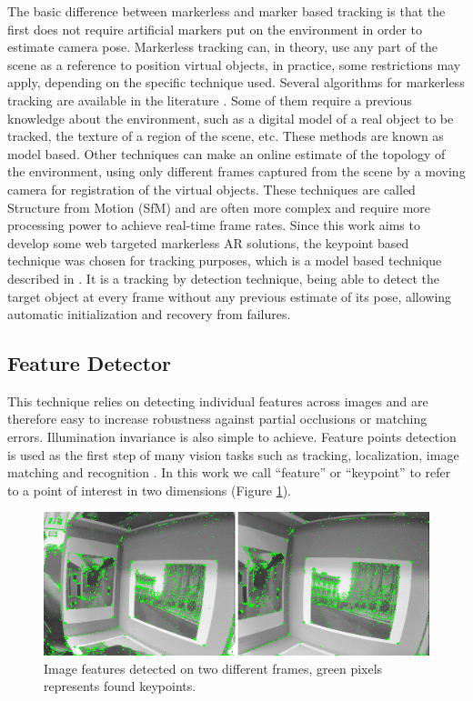 The basic difference between markerless and marker based tracking is that the first does not require artificial markers put on the environment in order to estimate camera pose. Markerless tracking can, in theory, use any part of the scene as a reference to position virtual objects, in practice, some restrictions may apply, depending on the specific technique used. Several algorithms for markerless tracking are available in the literature \cite{Teichrieb2007}. Some of them require a previous knowledge about the environment, such as a digital model of a real object to be tracked, the texture of a region of the scene, etc. These methods are known as model based. Other techniques can make an online estimate of the topology of the environment, using only different frames captured from the scene by a moving camera for registration of the virtual objects. These techniques are called Structure from Motion (SfM) and are often more complex and require more processing power to achieve real-time frame rates. Since this work aims to develop some web targeted markerless AR solutions, the keypoint based technique was chosen for tracking purposes, which is a model based technique described in \cite{Teichrieb2010}. It is a tracking by detection technique, being able to detect the target object at every frame without any previous estimate of its pose, allowing automatic initialization and recovery from failures.


\subsection{Feature Detector} %
\label{sub:tracking_library_for_the_web:marker_less_tracking_algorithm:feature_detector}

This technique relies on detecting individual features across images and are therefore easy to increase robustness against partial occlusions or matching errors. Illumination invariance is also simple to achieve. Feature points detection is used as the first step of many vision tasks such as tracking, localization, image matching and recognition \cite{Lepetit2005}. In this work we call ``feature'' or ``keypoint'' to refer to a point of interest in two dimensions (Figure \ref{figure:keypoints}).

\begin{figure}[!htb]
  \centering
  \includegraphics[width=380pt]{chapters/tracking_library_for_the_web/keypoints.png}
  \caption{Image features detected on two different frames, green pixels represents found keypoints.}
  \label{figure:keypoints}
\end{figure}

